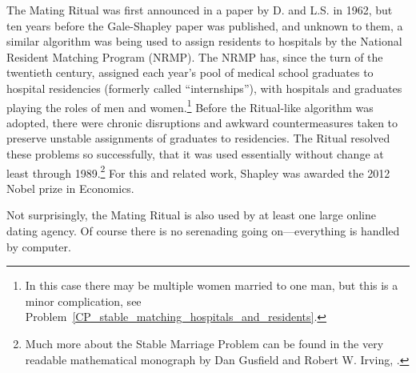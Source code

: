The Mating Ritual was first announced in a paper by D.  and
L.S.  in 1962, but ten years before the Gale-Shapley
paper was published, and unknown to them, a similar algorithm was
being used to assign residents to hospitals by the National Resident
Matching Program (NRMP).
\iffalse
\footnote{Of course, there is no serenading going on in the
  hospitals---the preferences are submitted to a program and the whole
  process is carried out by a computer.}  \fi The NRMP has, since the
turn of the twentieth century, assigned each year's pool of medical
school graduates to hospital residencies (formerly called
``internships''), with hospitals and graduates playing the roles of
men and women.\footnote{In this case there may be multiple women
  married to one man, but this is a minor complication, see
  Problem~\ref{CP_stable_matching_hospitals_and_residents}.}  Before
the Ritual-like algorithm was adopted, there were chronic disruptions
and awkward countermeasures taken to preserve unstable assignments of
graduates to residencies.  The Ritual resolved these problems so
successfully, that it was used essentially without change at least
through 1989.\footnote{Much more about the Stable Marriage Problem can
  be found in the very readable mathematical monograph by Dan Gusfield
  and Robert W. Irving,
  \href{http://mitpress.mit.edu/catalog/item/default.asp?ttype=2&tid=7676}
       {\cite{Gusfield1989}}.}  For this and related work, Shapley was
awarded the 2012 Nobel prize in Economics.

Not surprisingly, the Mating Ritual is also used by at least one large
online dating agency.  Of course there is no serenading going
on---everything is handled by computer.

\begin{problems}

\practiceproblems
{}

\classproblems

\homeworkproblems
{}

\examproblems
{}

\end{problems}

\endinput
